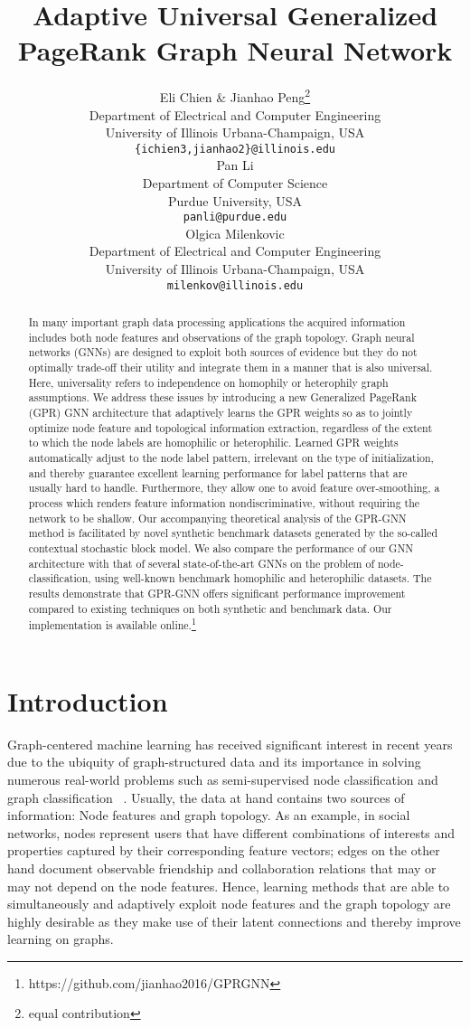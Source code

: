 \documentclass{article} \usepackage{iclr2021_conference,times}
\title{Adaptive Universal Generalized PageRank Graph Neural Network}
\author{Eli Chien \& Jianhao Peng\thanks{equal contribution} \\
Department of Electrical and Computer Engineering\\
University of Illinois Urbana-Champaign, USA \\
\texttt{\{ichien3,jianhao2\}@illinois.edu} \\
\AND
Pan Li \\
Department of Computer Science \\
Purdue University, USA \\
\texttt{panli@purdue.edu} \\
\And
Olgica Milenkovic \\
Department of Electrical and Computer Engineering\\
University of Illinois Urbana-Champaign, USA \\
\texttt{milenkov@illinois.edu} \\
}
\begin{document}
\maketitle

\begin{abstract}
In many important graph data processing applications the acquired information includes both node features and observations of the graph topology. Graph neural networks (GNNs) are designed to exploit both sources of evidence but they do not optimally trade-off their utility and integrate them in a manner that is also universal. Here, universality refers to independence on homophily or heterophily graph assumptions. We address these issues by introducing a new Generalized PageRank (GPR) GNN architecture that adaptively learns the GPR weights so as to jointly optimize node feature and topological information extraction, regardless of the extent to which the node labels are homophilic or heterophilic. Learned GPR weights automatically adjust to the node label pattern, irrelevant on the type of initialization, and thereby guarantee excellent learning performance for label patterns that are usually hard to handle. Furthermore, they allow one to avoid feature over-smoothing, a process which renders feature information nondiscriminative, without requiring the network to be shallow. Our accompanying theoretical analysis of the GPR-GNN method is facilitated by novel synthetic benchmark datasets generated by the so-called contextual stochastic block model. We also compare the performance of our GNN architecture with that of several state-of-the-art GNNs on the problem of node-classification, using well-known benchmark homophilic and heterophilic datasets. The results demonstrate that GPR-GNN offers significant performance improvement compared to existing techniques on both synthetic and benchmark data. Our implementation is available online.\footnote{https://github.com/jianhao2016/GPRGNN}
\end{abstract}

\section{Introduction}
Graph-centered machine learning has received significant interest in recent years due to the ubiquity of graph-structured data and its importance in solving numerous real-world problems such as semi-supervised node classification and graph classification ~\citep{zhu2005semi,shervashidze2011weisfeiler,lu2011link}. Usually, the data at hand contains two sources of information: Node features and graph topology. As an example, in social networks, nodes represent users that have different combinations of interests and properties captured by their corresponding feature vectors; edges on the other hand document observable friendship and collaboration relations that may or may not depend on the node features. Hence, learning methods that are able to simultaneously and adaptively exploit node features and the graph topology are highly desirable as they make use of their latent connections and thereby improve learning on graphs.
\end{document}
